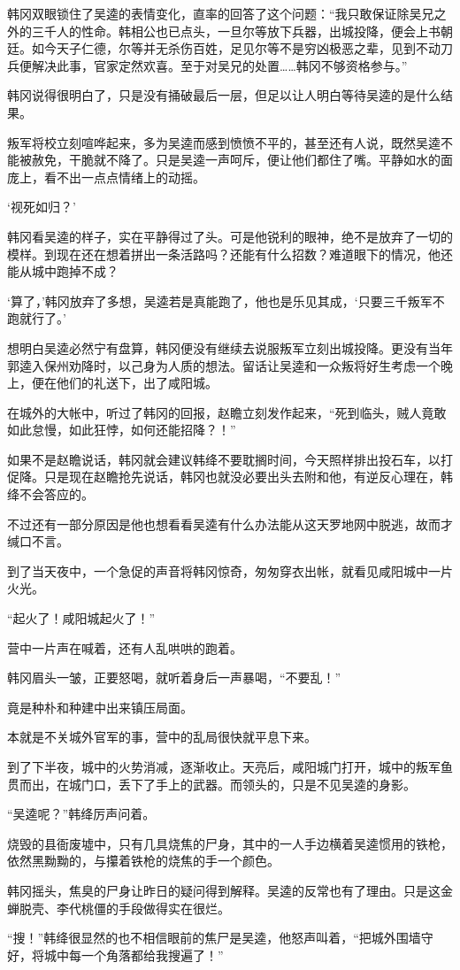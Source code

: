 韩冈双眼锁住了吴逵的表情变化，直率的回答了这个问题：“我只敢保证除吴兄之外的三千人的性命。韩相公也已点头，一旦尔等放下兵器，出城投降，便会上书朝廷。如今天子仁德，尔等并无杀伤百姓，足见尔等不是穷凶极恶之辈，见到不动刀兵便解决此事，官家定然欢喜。至于对吴兄的处置……韩冈不够资格参与。”

韩冈说得很明白了，只是没有捅破最后一层，但足以让人明白等待吴逵的是什么结果。

叛军将校立刻喧哗起来，多为吴逵而感到愤愤不平的，甚至还有人说，既然吴逵不能被赦免，干脆就不降了。只是吴逵一声呵斥，便让他们都住了嘴。平静如水的面庞上，看不出一点点情绪上的动摇。

‘视死如归？’

韩冈看吴逵的样子，实在平静得过了头。可是他锐利的眼神，绝不是放弃了一切的模样。到现在还在想着拼出一条活路吗？还能有什么招数？难道眼下的情况，他还能从城中跑掉不成？

‘算了，’韩冈放弃了多想，吴逵若是真能跑了，他也是乐见其成，‘只要三千叛军不跑就行了。’

想明白吴逵必然宁有盘算，韩冈便没有继续去说服叛军立刻出城投降。更没有当年郭逵入保州劝降时，以己身为人质的想法。留话让吴逵和一众叛将好生考虑一个晚上，便在他们的礼送下，出了咸阳城。

在城外的大帐中，听过了韩冈的回报，赵瞻立刻发作起来，“死到临头，贼人竟敢如此怠慢，如此狂悖，如何还能招降？！”

如果不是赵瞻说话，韩冈就会建议韩绛不要耽搁时间，今天照样排出投石车，以打促降。只是现在赵瞻抢先说话，韩冈也就没必要出头去附和他，有逆反心理在，韩绛不会答应的。

不过还有一部分原因是他也想看看吴逵有什么办法能从这天罗地网中脱逃，故而才缄口不言。

到了当天夜中，一个急促的声音将韩冈惊奇，匆匆穿衣出帐，就看见咸阳城中一片火光。

“起火了！咸阳城起火了！”

营中一片声在喊着，还有人乱哄哄的跑着。

韩冈眉头一皱，正要怒喝，就听着身后一声暴喝，“不要乱！”

竟是种朴和种建中出来镇压局面。

本就是不关城外官军的事，营中的乱局很快就平息下来。

到了下半夜，城中的火势消减，逐渐收止。天亮后，咸阳城门打开，城中的叛军鱼贯而出，在城门口，丢下了手上的武器。而领头的，只是不见吴逵的身影。

“吴逵呢？”韩绛厉声问着。

烧毁的县衙废墟中，只有几具烧焦的尸身，其中的一人手边横着吴逵惯用的铁枪，依然黑黝黝的，与攥着铁枪的烧焦的手一个颜色。

韩冈摇头，焦臭的尸身让昨日的疑问得到解释。吴逵的反常也有了理由。只是这金蝉脱壳、李代桃僵的手段做得实在很烂。

“搜！”韩绛很显然的也不相信眼前的焦尸是吴逵，他怒声叫着，“把城外围墙守好，将城中每一个角落都给我搜遍了！”

